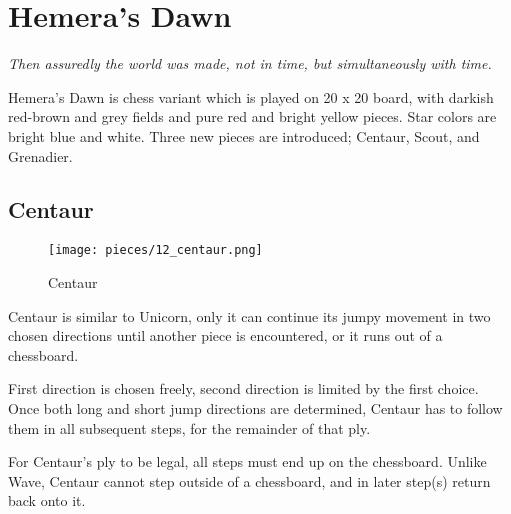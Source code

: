 

\chapter*{Hemera's Dawn}
\label{ch:Hemera's Dawn}

\begin{flushright}
\parbox{0.8\textwidth}{
\emph{Then assuredly the world was made, not in time, but simultaneously with time. \\
 } }
\end{flushright}

\noindent
Hemera's Dawn is chess variant which is played on 20 x 20 board, with
darkish red-brown and grey fields and pure red and bright yellow pieces.
Star colors are bright blue and white.
Three new pieces are introduced; Centaur, Scout, and Grenadier.

\clearpage %

\section*{Centaur}
\label{sec:Hemera's Dawn/Centaur}

\noindent
\begin{wrapfigure}[12]{l}{0.4\textwidth}
\centering
\texttt{[image: pieces/12\_centaur.png]}
\caption{Centaur}
\label{fig:12_centaur}
\end{wrapfigure}
Centaur is similar to Unicorn, only it can continue its jumpy movement
in two chosen directions until another piece is encountered, or it runs
out of a chessboard.

First direction is chosen freely, second direction is limited by the first
choice. Once both long and short jump directions are determined, Centaur
has to follow them in all subsequent steps, for the remainder of that ply.

For Centaur's ply to be legal, all steps must end up on the chessboard.
Unlike Wave, Centaur cannot step outside of a chessboard, and in later
step(s) return back onto it.

